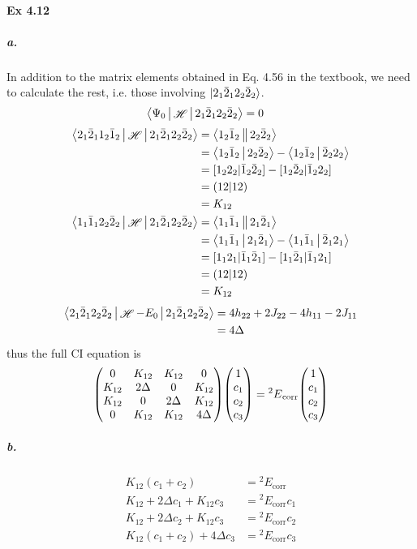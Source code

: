 \documentclass[a4paper]{article}
\DeclareMathOperator{\sH}{\mathscr{H}}
\DeclareMathOperator{\corr}{\mathrm{corr}}
\newcommand{\ex}[1]{\paragraph{Ex #1}}
\newcommand{\subex}[1]{\subparagraph{#1}}
\numberwithin{equation}{subsection}
\begin{document}
\ex{4.12}
\subex{a.}
In addition to the matrix elements obtained in Eq. 4.56 in the textbook, we need to calculate the rest, i.e. those involving $ \ket{2_1\bar{2}_1 2_2\bar{2}_2} $.
\begin{align}
\Braket{\Psi_0 | \sH | 2_1\bar{2}_1 2_2\bar{2}_2} &= 0 
\end{align}
\begin{align}
\Braket{2_1 \bar{2}_1 1_2\bar{1}_2 | \sH | 2_1\bar{2}_1 2_2\bar{2}_2} &= \Braket{1_2\bar{1}_2 || 2_2\bar{2}_2} \notag\\
&= \Braket{1_2\bar{1}_2 | 2_2\bar{2}_2} - \Braket{1_2\bar{1}_2 | \bar{2}_2 2_2} \notag\\
&= [1_2 2_2|\bar{1}_2 \bar{2}_2] - [1_2 \bar{2}_2 |\bar{1}_2 2_2] \notag\\
&= (12|12) \notag\\
&= K_{12} \\
\Braket{1_1 \bar{1}_1 2_2\bar{2}_2 | \sH | 2_1\bar{2}_1 2_2\bar{2}_2} &= \Braket{1_1 \bar{1}_1 || 2_1\bar{2}_1} \notag\\
&= \Braket{1_1 \bar{1}_1 | 2_1\bar{2}_1} - \Braket{1_1 \bar{1}_1 |\bar{2}_1 2_1} \notag\\
&= [1_1 2_1|\bar{1}_1 \bar{2}_1] - [1_1 \bar{2}_1 |\bar{1}_1 2_1] \notag\\
&= (12|12) \notag\\
&= K_{12}
\end{align}
\begin{align}
\Braket{2_1\bar{2}_1 2_2\bar{2}_2 | \sH - E_0 | 2_1\bar{2}_1 2_2\bar{2}_2} &= 4h_{22} + 2J_{22} - 4h_{11} - 2J_{11} \notag\\
&= 4\Delta
\end{align}
thus the full CI equation is
\begin{equation}\label{key}
\mqty(0 & K_{12} & K_{12} & 0\\
      K_{12} & 2\Delta & 0 & K_{12}\\
      K_{12} & 0 & 2\Delta & K_{12}\\
      0 & K_{12} & K_{12} & 4\Delta)
\mqty(1\\ c_1 \\ c_2 \\ c_3) = {^2 E}_{\corr} \mqty(1\\ c_1 \\ c_2 \\ c_3)
\end{equation}
\iffalse
\subex{b.}
\begin{align}
K_{12} (c_1 + c_2) &= {^2 E}_{\corr} \\
K_{12} + 2\Delta c_1 + K_{12}c_3 &= {^2 E}_{\corr}c_1 \label{b2}\\
K_{12} + 2\Delta c_2 + K_{12}c_3 &= {^2 E}_{\corr}c_2 \label{b3}\\
K_{12}(c_1 + c_2) + 4\Delta c_3 &= {^2 E}_{\corr}c_3 
\end{align}
\end{document}
